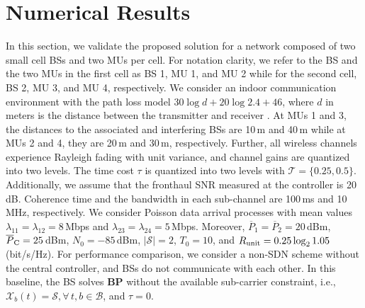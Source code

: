\documentclass[conference]{IEEEtran}
\newcommand{\totalpower}[1]{%
	\overline{P}_{#1}%
}
\begin{document}
\section{Numerical Results}\label{Sec: Numerical Results}
%
%
%
%
%
%
In this section, we validate the proposed solution for a network composed of  two small cell BSs and two MUs per cell.
For notation clarity, we refer to the BS and the two MUs in the first cell as BS 1, MU 1, and MU 2 while for the second cell, BS 2, MU 3, and MU 4, respectively.
We consider an indoor communication environment with the path loss model $30\log d+20\log 2.4+46$, where $d$ in meters is the distance between the transmitter and receiver \cite{rpt:itu_indoor}.
At MUs 1 and 3, the distances to the associated and interfering BSs are 10\,m and 40\,m while at MUs 2 and 4, they are 20\,m and 30\,m, respectively.
Further,  all wireless channels experience Rayleigh fading with unit variance, and channel gains are quantized into two levels.  The time cost $\tau$ is quantized into two levels with $\mathcal{T}=\{0.25,0.5\}$.
Additionally, we assume that the fronthaul SNR measured at the controller is 20\,dB. Coherence time and the bandwidth in each sub-channel  are 100\,ms and 10\,MHz, respectively.
We consider Poisson data arrival processes with  mean values $\lambda_{11}=\lambda_{12}=8$\,Mbps and $\lambda_{23}=\lambda_{24}=5$\,Mbps.
Moreover, $\totalpower 1=\totalpower 2=20$\,dBm, $\totalpower {\rm C}=25$\,dBm, $N_0=-85$\,dBm, $|\mathcal{S}|=2$, $T_0=10$, and $R_{\rm unit}=0.25\log_21.05$\,(bit/s/Hz). For performance comparison, we consider a non-SDN scheme without the central controller, and BSs do not communicate with each other. In this baseline, the BS solves {\bf BP} without the available sub-carrier  constraint, i.e., $\mathcal{X}_b(t)=\mathcal{S},\forall\,t,b\in\mathcal{B}$, and $\tau=0$.
%
%
%
%
\end{document}
